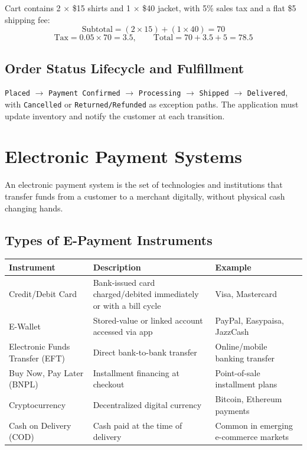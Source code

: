 \documentclass[11pt,a4paper]{article}
\begin{document}
\begin{examplebox}
Cart contains 2 $\times$ \$15 shirts and 1 $\times$ \$40 jacket, with 5\% sales tax and a flat \$5 shipping fee:
$$
\text{Subtotal} = (2 \times 15) + (1 \times 40) = 70
$$
$$
\text{Tax} = 0.05 \times 70 = 3.5, \qquad \text{Total} = 70 + 3.5 + 5 = 78.5
$$
\end{examplebox}

\subsection{Order Status Lifecycle and Fulfillment}
\begin{conceptbox}
\texttt{Placed} $\to$ \texttt{Payment Confirmed} $\to$ \texttt{Processing} $\to$ \texttt{Shipped} $\to$ \texttt{Delivered}, with \texttt{Cancelled} or \texttt{Returned/Refunded} as exception paths. The application must update inventory and notify the customer at each transition.
\end{conceptbox}

\section{Electronic Payment Systems}

\begin{definitionbox}
An electronic payment system is the set of technologies and institutions that transfer funds from a customer to a merchant digitally, without physical cash changing hands.
\end{definitionbox}

\subsection{Types of E-Payment Instruments}
\begin{center}
\begin{tabular}{@{}p{2.6cm}p{5.0cm}p{5.2cm}@{}}
\toprule
\rowcolor{primary!15}
\textbf{Instrument} & \textbf{Description} & \textbf{Example} \\
\midrule
Credit/Debit Card & Bank-issued card charged/debited immediately or with a bill cycle & Visa, Mastercard \\
E-Wallet & Stored-value or linked account accessed via app & PayPal, Easypaisa, JazzCash \\
Electronic Funds Transfer (EFT) & Direct bank-to-bank transfer & Online/mobile banking transfer \\
Buy Now, Pay Later (BNPL) & Installment financing at checkout & Point-of-sale installment plans \\
Cryptocurrency & Decentralized digital currency & Bitcoin, Ethereum payments \\
Cash on Delivery (COD) & Cash paid at the time of delivery & Common in emerging e-commerce markets \\
\bottomrule
\end{tabular}
\end{center}
\end{document}
